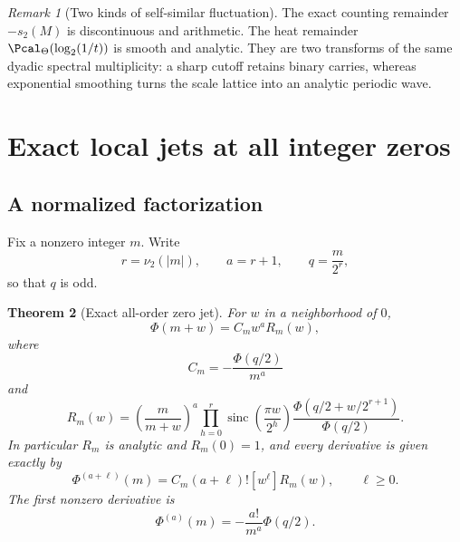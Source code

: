 \documentclass[11pt]{article}
\numberwithin{equation}{section}
\newtheorem{theorem}{Theorem}[section]
\theoremstyle{definition}
\theoremstyle{remark}
\newtheorem{remark}[theorem]{Remark}
\newcommand{\sinc}{\operatorname{sinc}}
\begin{document}
\begin{remark}[Two kinds of self-similar fluctuation]
The exact counting remainder $-s_2(M)$ is discontinuous and arithmetic.  The heat remainder $\Pcal_\Theta(\log_2(1/t))$ is smooth and analytic.  They are two transforms of the same dyadic spectral multiplicity: a sharp cutoff retains binary carries, whereas exponential smoothing turns the scale lattice into an analytic periodic wave.
\end{remark}

\section{Exact local jets at all integer zeros}

\subsection{A normalized factorization}

Fix a nonzero integer $m$.  Write
\begin{equation}\label{p7:eq:m-rq}
 r=\nu_2(|m|),\qquad a=r+1,\qquad q=\frac{m}{2^r},
\end{equation}
so that $q$ is odd.

\begin{theorem}[Exact all-order zero jet]\label{p7:thm:local-jet}
For $w$ in a neighborhood of $0$,
\begin{equation}\label{p7:eq:local-factor}
 \Phi(m+w)=C_mw^aR_m(w),
\end{equation}
where
\begin{equation}\label{p7:eq:Cm}
 \boxed{\ C_m=-\frac{\Phi(q/2)}{m^a}\ }
\end{equation}
and
\begin{equation}\label{p7:eq:Rm}
 R_m(w)=
 \left(\frac{m}{m+w}\right)^a
 \prod_{h=0}^{r}\sinc\!\left(\frac{\pi w}{2^h}\right)
 \frac{\Phi\!\left(q/2+w/2^{r+1}\right)}{\Phi(q/2)}.
\end{equation}
In particular $R_m$ is analytic and $R_m(0)=1$, and every derivative is given exactly by
\begin{equation}\label{p7:eq:all-jets}
 \boxed{\ \Phi^{(a+\ell)}(m)
 =C_m(a+\ell)![w^\ell]R_m(w),\qquad \ell\ge0.\ }
\end{equation}
The first nonzero derivative is
\begin{equation}\label{p7:eq:first-derivative-zero}
 \boxed{\ \Phi^{(a)}(m)=-\frac{a!}{m^a}\Phi(q/2).\ }
\end{equation}
\end{theorem}
\end{document}
